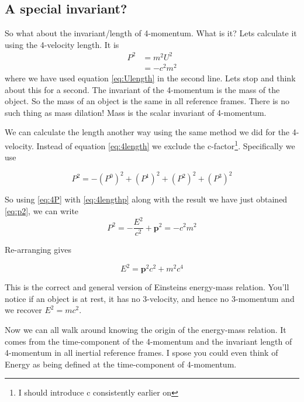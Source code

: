 \subsection{A special invariant?}

So what about the invariant/length of 4-momentum. What is it? Lets calculate it using the 4-velocity length.
It is
\begin{equation}
  \begin{aligned}
  P^2 &= m^2 U^2 \\
      &= -c^2 m^2
    \end{aligned}
    \label{eq:p2}
\end{equation}
where we have used equation \eqref{eq:Ulength} in the second line. Lets stop and think about this for a second. The invariant of the 4-momentum is the mass of the object. So the mass of an object is the same in all reference frames. There is no such thing as mass dilation! Mass is the scalar invariant of 4-momentum. 

We can calculate the length another way using the same method we did for the 4-velocity. Instead of equation \eqref{eq:4length} we exclude the c-factor\footnote{I should introduce c consistently earlier on}. Specifically we use

\begin{equation}
  P^2 = - (P^0)^2+ (P^1)^2 + (P^2)^2+(P^3)^2
  \label{eq:4lengthp}
\end{equation}

So using \eqref{eq:4P} with \eqref{eq:4lengthp} along with the result we have just obtained \eqref{eq:p2}, we can write
\begin{equation}
  P^2 = -\frac{E^2}{c^2} + \mathbf{p}^2 = - c^2 m^2 
\end{equation}

Re-arranging gives

\begin{equation}
  E^2 = \mathbf{p}^2 c^2 + m^2 c^4
\end{equation}

This is the correct and general version of Einsteins energy-mass relation. You'll notice if an object is at rest, it has no 3-velocity, and hence no 3-momentum and we recover $E^2 = m c^2$.

Now we can all walk around knowing the origin of the energy-mass relation. It comes from the time-component of the 4-momentum and the invariant length of 4-momentum in all inertial reference frames. I spose you could even think of Energy as being defined at the time-component of 4-momentum. 

